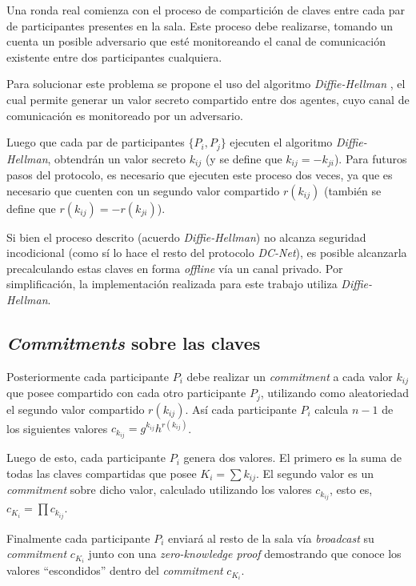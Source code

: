 Una ronda real comienza con el proceso de compartición de claves entre cada 
par de participantes presentes en la sala. Este proceso debe realizarse, 
tomando un cuenta un posible adversario que esté monitoreando el canal de 
comunicación existente entre dos participantes cualquiera.

Para solucionar este problema se propone el uso del algoritmo 
\emph{Diffie-Hellman} \cite{diffie1976new}, el cual permite generar un valor 
secreto compartido entre dos agentes, cuyo canal de comunicación es 
monitoreado por un adversario.

Luego que cada par de participantes $\{P_i, P_j\}$ ejecuten el algoritmo 
\emph{Diffie-Hellman}, obtendrán un valor secreto $k_{ij}$ 
(y se define que $k_{ij} = -k_{ji}$). Para futuros pasos del protocolo, es 
necesario que ejecuten este proceso dos veces, ya que es necesario que cuenten 
con un segundo valor compartido $r(k_{ij})$ (también se define que 
$r(k_{ij}) = -r(k_{ji})$).

Si bien el proceso descrito (acuerdo \emph{Diffie-Hellman}) no alcanza 
seguridad incodicional (como sí lo hace el resto del protocolo \emph{DC-Net}), 
es posible alcanzarla precalculando estas claves en forma \emph{offline} vía 
un canal privado. Por simplificación, la implementación realizada para este 
trabajo utiliza \emph{Diffie-Hellman}.

\subsection{\emph{Commitments} sobre las claves}

Posteriormente cada participante $P_i$ debe realizar un \emph{commitment} a 
cada valor $k_{ij}$ que posee compartido con cada otro participante $P_j$, 
utilizando como aleatoriedad el segundo valor compartido $r(k_{ij})$. Así cada 
participante $P_i$ calcula $n - 1$ de los siguientes valores 
$c_{k_{ij}} = g^{k_{ij}} h^{r(k_{ij})}$.

Luego de esto, cada participante $P_i$ genera dos valores. El primero es 
la suma de todas las claves compartidas que posee $K_i = \sum k_{ij}$. El 
segundo valor es un \emph{commitment} sobre dicho valor, calculado utilizando 
los valores $c_{k_{ij}}$, esto es, 
$c_{K_i} = \prod c_{k_{ij}}$.

Finalmente cada participante $P_i$ enviará al resto de la sala vía 
\emph{broadcast} su \emph{commitment} $c_{K_i}$ junto con una 
\emph{zero-knowledge proof} demostrando que conoce los valores ``escondidos'' 
dentro del \emph{commitment} $c_{K_i}$.

